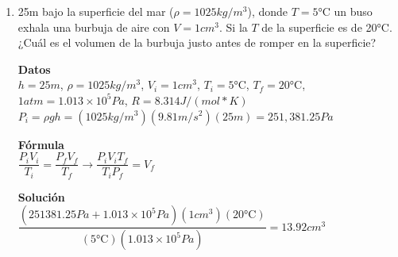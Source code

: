 \documentclass[a4paper, 11pt]{article}
\newcommand{\Pspace}{0.5cm}
\newcommand{\Aspace}{0.2cm}
\begin{document}
\begin{enumerate}
{            \textbf{Fórmula} \\
            $PV = nRT \rightarrow P = \dfrac{nRT}{V}$ \par

            \textbf{Solución} \\
            $P = \dfrac{(0.5 mol)(8.314 J/(mol * K))(773.15 K)}{0.002 m^{3}} = 1,606,992.275 Pa$
        }



    \vspace{\Pspace}
    \item 25m bajo la superficie del mar ($\rho = 1025 kg/m^3$), donde $T = 5$°C un buso exhala una burbuja de aire con $V = 1cm^3$. Si la $T$ de la superficie es de 20°C. ¿Cuál es el volumen de la burbuja justo antes de romper en la superficie? \par
        \vspace{\Aspace} \par
        { \color{azul}  
            \textbf{Datos} \\
            $h = 25m$, $\rho = 1025 kg/m^{3}$, $V_{i} = 1 cm^{3}$, $T_{i} = 5$°C, $T_{f} = 20$°C, $1 atm = 1.013 \times 10^{5} Pa$, $R = 8.314 J/(mol * K)$ \\
            $P_{i} = \rho g h = (1025 kg/m^{3}) (9.81 m/s^{2}) (25m) = 251,381.25 Pa$ \par

            \textbf{Fórmula} \\
            $\dfrac{P_{i} V_{i}}{T_{i}} = \dfrac{P_{f} V_{f}}{T_{f}} \rightarrow \dfrac{P_{i} V_{i} T_{f}}{T_{i} P_{f}} = V_{f}$ \par

            \textbf{Solución} \\
            $\dfrac{(251381.25 Pa + 1.013 \times 10^{5} Pa) (1 cm^{3}) (20\text{°C})}{(5\text{°C}) (1.013 \times 10^5 Pa)} = 13.92 cm^{3}$
        }
    \end{enumerate}
\end{document}
